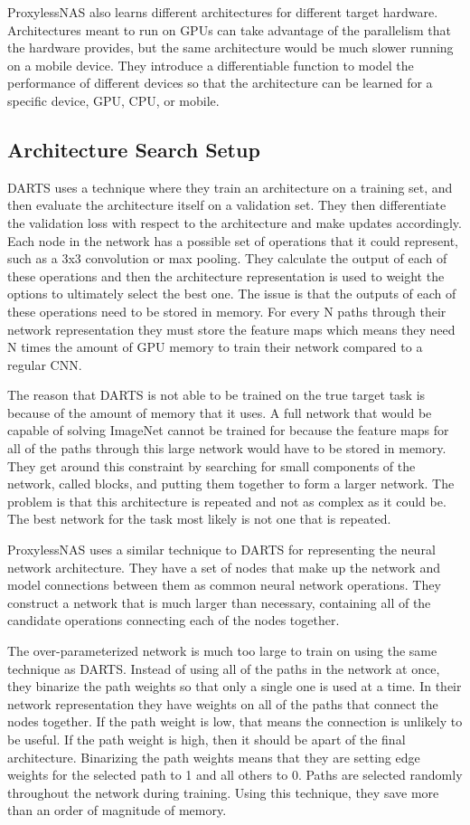\documentclass{ieee}
\begin{document}
ProxylessNAS also learns different architectures for different target hardware. Architectures meant to run on GPUs can take advantage of the parallelism that the hardware provides, but the same architecture would be much slower running on a mobile device. They introduce a differentiable function to model the performance of different devices so that the architecture can be learned for a specific device, GPU, CPU, or mobile. 

\subsection{Architecture Search Setup}
DARTS uses a technique where they train an architecture on a training set, and then evaluate the architecture itself on a validation set. They then differentiate the validation loss with respect to the architecture and make updates accordingly. Each node in the network has a possible set of operations that it could represent, such as a 3x3 convolution or max pooling. They calculate the output of each of these operations and then the architecture representation is used to weight the options to ultimately select the best one. The issue is that the outputs of each of these operations need to be stored in memory. For every N paths through their network representation they must store the feature maps which means they need N times the amount of GPU memory to train their network compared to a regular CNN.

The reason that DARTS is not able to be trained on the true target task is because of the amount of memory that it uses. A full network that would be capable of solving ImageNet cannot be trained for because the feature maps for all of the paths through this large network would have to be stored in memory. They get around this constraint by searching for small components of the network, called blocks, and putting them together to form a larger network. The problem is that this architecture is repeated and not as complex as it could be. The best network for the task most likely is not one that is repeated.

ProxylessNAS uses a similar technique to DARTS for representing the neural network architecture. They have a set of nodes that make up the network and model connections between them as common neural network operations. They construct a network that is much larger than necessary, containing all of the candidate operations connecting each of the nodes together.

The over-parameterized network is much too large to train on using the same technique as DARTS. Instead of using all of the paths in the network at once, they binarize the path weights so that only a single one is used at a time. In their network representation they have weights on all of the paths that connect the nodes together. If the path weight is low, that means the connection is unlikely to be useful. If the path weight is high, then it should be apart of the final architecture. Binarizing the path weights means that they are setting edge weights for the selected path to 1 and all others to 0. Paths are selected randomly throughout the network during training. Using this technique, they save more than an order of magnitude of memory.
\end{document}
